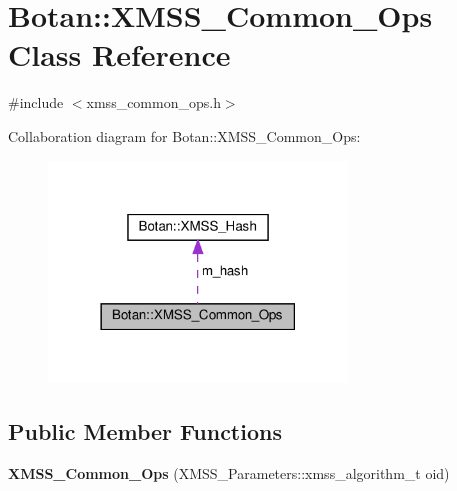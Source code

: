 \hypertarget{class_botan_1_1_x_m_s_s___common___ops}{}\section{Botan\+:\+:X\+M\+S\+S\+\_\+\+Common\+\_\+\+Ops Class Reference}
\label{class_botan_1_1_x_m_s_s___common___ops}


{\ttfamily \#include $<$xmss\+\_\+common\+\_\+ops.\+h$>$}



Collaboration diagram for Botan\+:\+:X\+M\+S\+S\+\_\+\+Common\+\_\+\+Ops\+:
\nopagebreak
\begin{figure}[H]
\begin{center}
\leavevmode
\includegraphics[width=225pt]{class_botan_1_1_x_m_s_s___common___ops__coll__graph}
\end{center}
\end{figure}
\subsection*{Public Member Functions}
\begin{DoxyCompactItemize}
\item 
\mbox{\label{class_botan_1_1_x_m_s_s___common___ops_a8f4946af95aa4f90c376a57db86541e6}} 
{\bfseries X\+M\+S\+S\+\_\+\+Common\+\_\+\+Ops} (X\+M\+S\+S\+\_\+\+Parameters\+::xmss\+\_\+algorithm\+\_\+t oid)
\end{DoxyCompactItemize}
